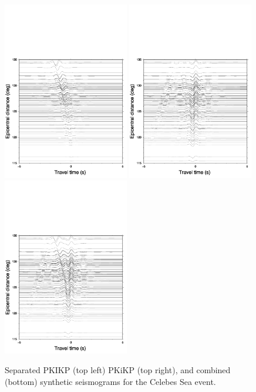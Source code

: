 \documentclass[11pt,a4paper]{article}
\begin{document}
\begin{figure}
	\centering
	\includegraphics[width=0.49\textwidth]{figures/celebessea_KIK_aligned}
	\includegraphics[width=0.49\textwidth]{figures/celebessea_pkikp_aligned}
	\includegraphics[width=0.49\textwidth]{figures/celebessea_both_aligned}
	\caption{Separated PKIKP (top left) PKiKP (top right), and combined (bottom) synthetic seismograms for the Celebes Sea event.}
	\label{fig:Synth aligned}
\end{figure}
\end{document}
